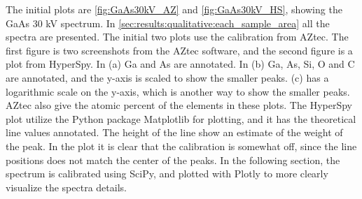 The initial plots are \cref{fig:GaAs30kV_AZ} and \cref{fig:GaAs30kV_HS}, showing the GaAs 30 kV spectrum.
In \cref{sec:results:qualitative:each_sample_area} all the spectra are presented.
The initial two plots use the calibration from AZtec.
The first figure is two screenshots from the AZtec software, and the second figure is a plot from HyperSpy.
In (a) Ga and As are annotated.
In (b) Ga, As, Si, O and C are annotated, and the y-axis is scaled to show the smaller peaks.
(c) has a logarithmic scale on the y-axis, which is another way to show the smaller peaks.
AZtec also give the atomic percent of the elements in these plots.
The HyperSpy plot utilize the Python package Matplotlib for plotting, and it has the theoretical line values annotated.
The height of the line show an estimate of the weight of the peak.
In the plot it is clear that the calibration is somewhat off, since the line positions does not match the center of the peaks.
In the following section, the spectrum is calibrated using SciPy, and plotted with Plotly to more clearly visualize the spectra details.

